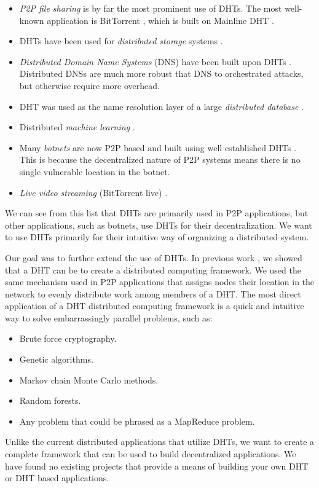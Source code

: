 \begin{itemize}
	\item \textit{P2P file sharing} is by far the most prominent use of DHTs.  
	The most well-known application is BitTorrent \cite{bittorrent}, which is built on Mainline DHT \cite{mainline}.
	\item DHTs have been used for \textit{distributed storage} systems \cite{CFS}.
	\item \textit{Distributed Domain Name Systems} (DNS) have been built upon DHTs \cite{cox2002serving} \cite{pappas2006comparative}.
	Distributed DNSs are much more robust that DNS to orchestrated attacks, but otherwise require more overhead.
	\item DHT was used as the name resolution layer of a large \textit{distributed database} \cite{Mateescu2011440}.
	\item Distributed \textit{machine learning} \cite{liparameter}.
	\item Many \textit{botnets} are now P2P based and built using well established DHTs \cite{saad2011detecting}. 
	This is because the decentralized nature of P2P systems means there is no single vulnerable location in the botnet.
	\item \textit{Live video streaming} (BitTorrent live) \cite{mol2009design}.
\end{itemize}

We can see from this list that DHTs are primarily used in P2P applications, but other applications, such as botnets, use DHTs for their decentralization.
We want to use DHTs primarily for their intuitive way of organizing a distributed system.

Our goal was to further extend the use of DHTs.
In previous work \cite{chordreduce}, we showed  that a DHT can be to create a distributed computing framework.
We used the same mechanism used in P2P applications that assigns nodes their location in the network to evenly distribute work among members of a DHT.
The most direct application of a DHT distributed computing framework is  a quick and intuitive way to solve embarrassingly parallel problems, such as:
\begin{itemize}
	\item Brute force cryptography.
	\item Genetic algorithms.
	\item Markov chain Monte Carlo methods.
	\item Random forests.
	\item Any problem that could be phrased as a MapReduce problem.
	
\end{itemize}
Unlike the current distributed applications that utilize DHTs, we want to create a complete framework that can be used to build decentralized applications.
We have found no existing projects that provide a means of building your own DHT or DHT based applications. %


